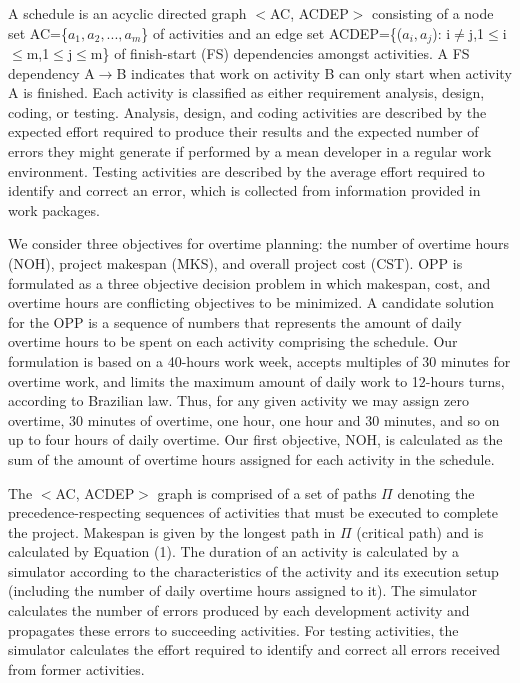 \documentclass[conference]{IEEEtran}
\begin{document}
A schedule is an acyclic directed graph $<$AC, ACDEP$>$ consisting of a node set AC=\{$a_1, a_2, ..., a_m$\} of activities and an edge set ACDEP=\{($a_i, a_j$): i$\not=$j,1$\leq$i$\leq$m,1$\leq$j$\leq$m\} of finish-start (FS) dependencies amongst activities. A FS dependency A$\rightarrow$B indicates that work on activity B can only start when activity A is finished. Each activity is classified as either requirement analysis, design, coding, or testing. Analysis, design, and coding activities are described by the expected effort required to produce their results and the expected number of errors they might generate if performed by a mean developer in a regular work environment. Testing activities are described by the average effort required to identify and correct an error, which is collected from information provided in work packages.

We consider three objectives for overtime planning: the number of overtime hours (NOH), project makespan (MKS), and overall project cost (CST). OPP is formulated as a three objective decision problem in which makespan, cost, and overtime hours are conflicting objectives to be minimized. A candidate solution for the OPP is a sequence of numbers that represents the amount of daily overtime hours to be spent on each activity comprising the schedule. Our formulation is based on a 40-hours work week, accepts multiples of 30 minutes for overtime work, and limits the maximum amount of daily work to 12-hours turns, according to Brazilian law. Thus, for any given activity we may assign zero overtime, 30 minutes of overtime, one hour, one hour and 30 minutes, and so on up to four hours of daily overtime. Our first objective, NOH, is calculated as the sum of the amount of overtime hours assigned for each activity in the schedule.

The $<$AC, ACDEP$>$ graph is comprised of a set of paths $\Pi$ denoting the precedence-respecting sequences of activities that must be executed to complete the project. Makespan is given by the longest path in $\Pi$ (critical path) and is calculated by Equation (1). The duration of an activity is calculated by a simulator according to the characteristics of the activity and its execution setup (including the number of daily overtime hours assigned to it). The simulator calculates the number of errors produced by each development activity and propagates these errors to succeeding activities. For testing activities, the simulator calculates the effort required to identify and correct all errors received from former activities.
\end{document}

